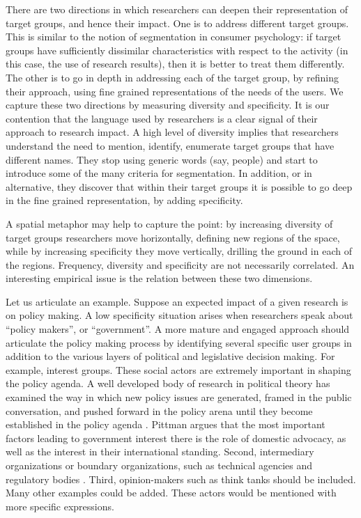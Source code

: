 \documentclass[b5paper,]{book}
\theoremstyle{definition}
\theoremstyle{definition}
\theoremstyle{definition}
\theoremstyle{remark}
\begin{document}
There are two directions in which researchers can deepen their
representation of target groups, and hence their impact. One is to
address different target groups. This is similar to the notion of
segmentation in consumer psychology: if target groups have sufficiently
dissimilar characteristics with respect to the activity (in this case,
the use of research results), then it is better to treat them
differently. The other is to go in depth in addressing each of the
target group, by refining their approach, using fine grained
representations of the needs of the users. We capture these two
directions by measuring diversity and specificity. It is our contention
that the language used by researchers is a clear signal of their
approach to research impact. A high level of diversity implies that
researchers understand the need to mention, identify, enumerate target
groups that have different names. They stop using generic words (say,
people) and start to introduce some of the many criteria for
segmentation. In addition, or in alternative, they discover that within
their target groups it is possible to go deep in the fine grained
representation, by adding specificity.

A spatial metaphor may help to capture the point: by increasing
diversity of target groups researchers move horizontally, defining new
regions of the space, while by increasing specificity they move
vertically, drilling the ground in each of the regions. Frequency,
diversity and specificity are not necessarily correlated. An interesting
empirical issue is the relation between these two dimensions.

Let us articulate an example. Suppose an expected impact of a given
research is on policy making. A low specificity situation arises when
researchers speak about ``policy makers'', or ``government''. A more
mature and engaged approach should articulate the policy making process
by identifying several specific user groups in addition to the various
layers of political and legislative decision making. For example,
interest groups. These social actors are extremely important in shaping
the policy agenda. A well developed body of research in political theory
has examined the way in which new policy issues are generated, framed in
the public conversation, and pushed forward in the policy arena until
they become established in the policy agenda
\citep{sabatier1987knowledge}. Pittman \citep{pittman2006beyond} argues
that the most important factors leading to government interest there is
the role of domestic advocacy, as well as the interest in their
international standing. Second, intermediary organizations or boundary
organizations, such as technical agencies and regulatory bodies
\citep{agrawala2001integrating}. Third, opinion-makers such as think
tanks should be included. Many other examples could be added. These
actors would be mentioned with more specific expressions.
\end{document}
